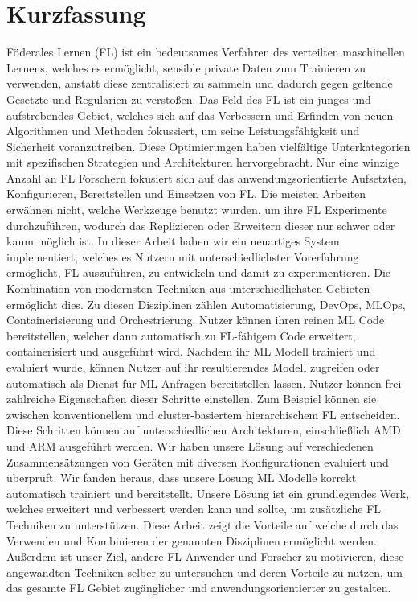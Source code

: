 \chapter{Kurzfassung}

Föderales Lernen (FL) ist ein bedeutsames Verfahren des verteilten maschinellen Lernens, welches es ermöglicht, sensible private Daten zum Trainieren zu verwenden, anstatt diese zentralisiert zu sammeln und dadurch gegen geltende Gesetzte und Regularien zu verstoßen.
Das Feld des FL ist ein junges und aufstrebendes Gebiet, welches sich auf das Verbessern und Erfinden von neuen Algorithmen und Methoden fokussiert, um seine Leistungsfähigkeit und Sicherheit voranzutreiben.
Diese Optimierungen haben vielfältige Unterkategorien mit spezifischen Strategien und Architekturen hervorgebracht.
Nur eine winzige Anzahl an FL Forschern fokusiert sich auf das anwendungsorientierte Aufsetzten, Konfigurieren, Bereitstellen und Einsetzen von FL.
Die meisten Arbeiten erwähnen nicht, welche Werkzeuge benutzt wurden, um ihre FL Experimente durchzuführen, wodurch das Replizieren oder Erweitern dieser nur schwer oder kaum möglich ist.
In dieser Arbeit haben wir ein neuartiges System implementiert, welches es Nutzern mit unterschiedlichster Vorerfahrung ermöglicht, FL auszuführen, zu entwickeln und damit zu experimentieren.
Die Kombination von modernsten Techniken aus unterschiedlichsten Gebieten ermöglicht dies.
Zu diesen Disziplinen zählen Automatisierung, DevOps, MLOps, Containerisierung und Orchestrierung.
Nutzer können ihren reinen ML Code bereitstellen, welcher dann automatisch zu FL-fähigem Code erweitert, containerisiert und ausgeführt wird.
Nachdem ihr ML Modell trainiert und evaluiert wurde, können Nutzer auf ihr resultierendes Modell zugreifen oder automatisch als Dienst für ML Anfragen bereitstellen lassen.
Nutzer können frei zahlreiche Eigenschaften dieser Schritte einstellen.
Zum Beispiel können sie zwischen konventionellem und cluster-basiertem hierarchischem FL entscheiden.
Diese Schritten können auf unterschiedlichen Architekturen, einschließlich AMD und ARM ausgeführt werden.
Wir haben unsere Lösung auf verschiedenen Zusammensätzungen von Geräten mit diversen Konfigurationen evaluiert und überprüft.
Wir fanden heraus, dass unsere Lösung ML Modelle korrekt automatisch trainiert und bereitstellt.
Unsere Lösung ist ein grundlegendes Werk, welches erweitert und verbessert werden kann und sollte, um zusätzliche FL Techniken zu unterstützen.
Diese Arbeit zeigt die Vorteile auf welche durch das Verwenden und Kombinieren der genannten Disziplinen ermöglicht werden.
Außerdem ist unser Ziel, andere FL Anwender und Forscher zu motivieren, diese angewandten Techniken selber zu untersuchen und deren Vorteile zu nutzen, um das gesamte FL Gebiet zugänglicher und anwendungsorientierter zu gestalten.